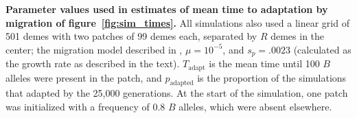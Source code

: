\documentclass[10pt,letterpaper]{article}
\begin{document}
{
    \textbf{Parameter values used in estimates of mean time to adaptation by migration of figure~\ref{fig:sim_times}.}
            All simulations also used a linear grid of 501 demes with two patches of 99 demes each,
            separated by $R$ demes in the center;
            the migration model described in ,
            $\mu=10^{-5}$, and $s_p=.0023$ (calculated as the growth rate as described in the text).
            $T_\text{adapt}$ is the mean time until 100 $B$ alleles were present in the patch,
            and $p_\text{adapted}$ is the proportion of the simulations that adapted by the 25,000 generations.
            At the start of the simulation, one patch was initialized with a frequency of 0.8 $B$ alleles, which were absent elsewhere.
            } 
\end{document}
